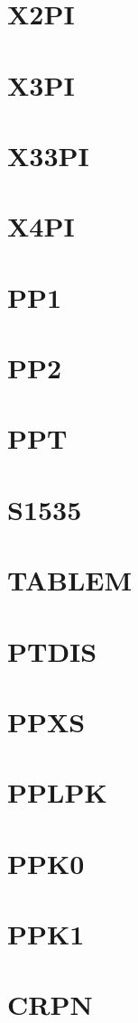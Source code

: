 \documentclass[10pt,UTF8]{ctexbook}
\begin{document}
\section{X2PI}
\section{X3PI}
\section{X33PI}
\section{X4PI}
\section{PP1}
\section{PP2}
\section{PPT}
\section{S1535}
\section{TABLEM}
\section{PTDIS}
\section{PPXS}
\section{PPLPK}
\section{PPK0}
\section{PPK1}
\section{CRPN}
\end{document}
